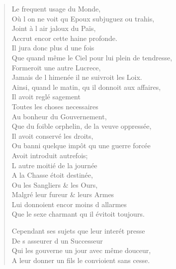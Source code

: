 \begin{verse}
\vin Le frequent usage du Monde, \\
Où l\textquotesingle{} on ne voit qu\textquotesingle{} Epoux subjuguez ou trahis, \\
\vin Joint à l\textquotesingle{} air jaloux du Païs, \\
\vin Accrut encor cette haine profonde. \\
\vin Il jura donc plus d\textquotesingle{} une fois \\
Que quand même le Ciel pour lui plein de tendresse, \\
\vin Formeroit une autre Lucrece, \\
Jamais de l\textquotesingle{} himenée il ne suivroit les Loix. \\
Ainsi, quand le matin, qu\textquotesingle{} il donnoit aux affaires, \\
\vin Il avoit reglé sagement \\
\vin Toutes les choses necessaires \\
\vin Au bonheur du Gouvernement, \\
Que du foible orphelin, de la veuve oppressée, \\
\vin Il avoit conservé les droits, \\
Ou banni quelque impôt qu\textquotesingle{} une guerre forcée \\
\vin Avoit introduit autrefois; \\
\vin L\textquotesingle{} autre moitié de la journée \\
\vin A la Chasse étoit destinée, \\
\vin Ou les Sangliers \& les Ours, \\
\vin Malgré leur fureur \& leurs Armes \\
\vin Lui donnoient encor moins d\textquotesingle{} allarmes \\
Que le sexe charmant qu\textquotesingle{} il évitoit toujours.

Cependant ses sujets que leur interét presse \\
\vin De s\textquotesingle{} asseurer d\textquotesingle{} un Successeur \\
Qui les gouverne un jour avec même douceur, \\
A leur donner un fils le convioient sans cesse.


\end{verse}
